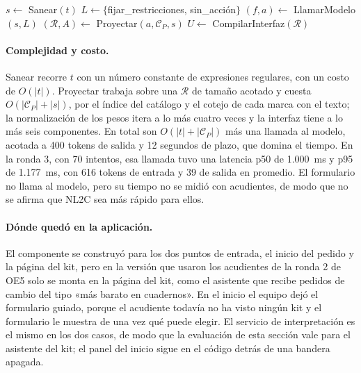 \begin{algorithm}[H]
\caption{Interpretación de una preferencia en lenguaje natural}
\label{alg:nl2c}
$s\leftarrow$ Sanear$(t)$ 
$L\leftarrow\{$fijar\_restricciones, sin\_acción$\}$ 
$(f,a)\leftarrow$ LlamarModelo$(s,L)$ 
$(\mathcal{R},A)\leftarrow$ Proyectar$(a,\mathcal{C}_P,s)$ 
$U\leftarrow$ CompilarInterfaz$(\mathcal{R})$ 
 
\end{algorithm}

\paragraph{Complejidad y costo.} Sanear recorre $t$ con un número constante de expresiones
regulares, con un costo de $O(|t|)$. Proyectar trabaja sobre una $\mathcal{R}$ de tamaño acotado y
cuesta $O(|\mathcal{C}_P|+|s|)$, por el índice del catálogo y el cotejo de cada marca con el texto;
la normalización de los pesos itera a lo más cuatro veces y la interfaz tiene a lo más seis
componentes. En total son $O(|t|+|\mathcal{C}_P|)$ más una llamada al modelo, acotada a 400 tokens de
salida y 12 segundos de plazo, que domina el tiempo. En la ronda 3, con 70 intentos, esa llamada tuvo
una latencia p50 de 1.000~ms y p95 de 1.177~ms, con 616 tokens de entrada y 39 de salida en promedio.
El formulario no llama al modelo, pero su tiempo no se midió con acudientes, de modo que no se afirma
que NL2C sea más rápido para ellos.

\paragraph{Dónde quedó en la aplicación.} El componente se construyó para los dos puntos de
entrada, el inicio del pedido y la página del kit, pero en la versión que usaron los acudientes de
la ronda 2 de OE5 solo se monta en la página del kit, como el asistente que recibe pedidos de cambio
del tipo «más barato en cuadernos». En el inicio el equipo dejó el formulario guiado, porque el
acudiente todavía no ha visto ningún kit y el formulario le muestra de una vez qué puede elegir. El
servicio de interpretación es el mismo en los dos casos, de modo que la evaluación de esta sección
vale para el asistente del kit; el panel del inicio sigue en el código detrás de una bandera
apagada.

